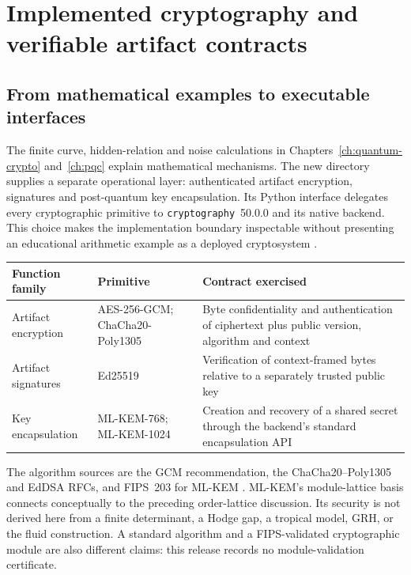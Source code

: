 \chapter{Implemented cryptography and verifiable artifact contracts}
\label{ch:implemented-cryptography}


\section{From mathematical examples to executable interfaces}

The finite curve, hidden-relation and noise calculations in
Chapters~\ref{ch:quantum-crypto} and~\ref{ch:pqc} explain mathematical mechanisms.
The new  directory supplies a separate operational layer:
authenticated artifact encryption, signatures and post-quantum key encapsulation.
Its Python interface delegates every cryptographic primitive to
\texttt{cryptography}~50.0.0 and its native backend. This choice makes the
implementation boundary inspectable without presenting an educational arithmetic
example as a deployed cryptosystem \cite{CryptoAPI50AEAD,CryptoAPI50Ed25519,CryptoAPI50MLKEM}.

\begin{longtable}{p{}p{}p{}}
\toprule
Function family & Primitive & Contract exercised\\\midrule
Artifact encryption & AES-256-GCM; ChaCha20-Poly1305 & Byte confidentiality and
authentication of ciphertext plus public version, algorithm and context\\
Artifact signatures & Ed25519 & Verification of context-framed bytes relative
to a separately trusted public key\\
Key encapsulation & ML-KEM-768; ML-KEM-1024 & Creation and recovery of a shared
secret through the backend's standard encapsulation API\\\bottomrule
\end{longtable}

The algorithm sources are the GCM recommendation, the ChaCha20--Poly1305 and
EdDSA RFCs, and FIPS~203 for ML-KEM
\cite{CryptoGCM38D,CryptoRFC8439,CryptoRFC8032,CryptoFIPS203}.
ML-KEM's module-lattice basis connects conceptually to the preceding order-lattice
discussion. Its security is not derived here from a finite determinant, a Hodge
gap, a tropical model, GRH, or the fluid construction. A standard algorithm and a
FIPS-validated cryptographic module are also different claims: this release
records no module-validation certificate.

